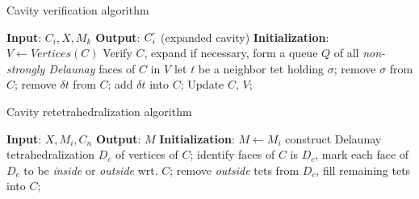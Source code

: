 \documentclass{beamer}
\begin{document}
\begin{frame}{Cavity verification algorithm}
\begin{algorithm}[H]
\caption{Cavity verification/expansion}
\begin{algorithmic}[1]
    \tiny{
    \State \textbf{Input}: $C_{i}, X, M_{k}$ 
    \State \textbf{Output}: $C_{i}^{`}$ (expanded cavity)
    \State \textbf{Initialization}: \State $V \gets Vertices(C)$
    \State Verify $C$, expand if necessary,
    \Repeat
    \State form a queue $Q$ of all \textit{non-strongly Delaunay} faces of $C$ in $V$
        \State let $t$ be a neighbor tet holding $\sigma$;
        \State remove $\sigma$ from $C$;
                \State remove $\delta t$ from $C$;
            \Else
                \State add $\delta t$ into $C$; 
            \EndIf
        \EndFor
        \State Update $C$, $V$;
    \EndFor
    \EndProcedure
    }
\end{algorithmic}
\end{algorithm}
\end{frame}

\begin{frame}{Cavity retetrahedralization algorithm}
\begin{algorithm}[H]
\caption{Refill cavity}
\begin{algorithmic}[1]
    \State \textbf{Input}: $X, M_{i}, C_{n}$
    \State \textbf{Output}: $M$
    \State \textbf{Initialization}: \State $M \gets M_{i}$
    \State construct Delaunay tetrahedralization $D_c$ of vertices of $C$;
    \State identify faces of $C$ is $D_c$, mark each face of $D_c$ to be \textit{inside} or \textit{outside} wrt. $C$;
    \State remove \textit{outside} tets from $D_c$, fill remaining tets into $C$;
    \EndProcedure
\end{algorithmic}
\end{algorithm}
\end{frame}
\end{document}
